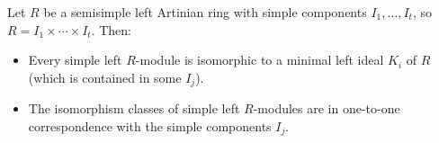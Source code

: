 Let $R$ be a semisimple left Artinian ring with simple components $I_1, \ldots, I_t$, so $R = I_1 \times \cdots \times I_t$. Then:
\begin{itemize}
\item[(i)] Every simple left $R$-module is isomorphic to a minimal left ideal $K_i$ of $R$ (which is contained in some $I_j$).
\item[(ii)] The isomorphism classes of simple left $R$-modules are in one-to-one correspondence with the simple components $I_j$.
\end{itemize}
